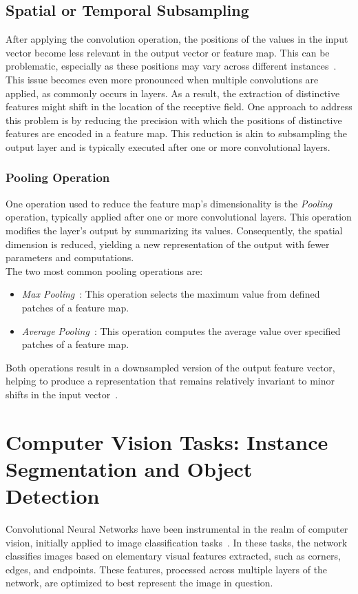 \subsection{Spatial or Temporal Subsampling}
After applying the convolution operation, the positions of the values in the input vector become less relevant in the output vector or feature map. This can be problematic, especially as these positions may vary across different instances~\cite{726791}. This issue becomes even more pronounced when multiple convolutions are applied, as commonly occurs in layers. As a result, the extraction of distinctive features might shift in the location of the receptive field. One approach to address this problem is by reducing the precision with which the positions of distinctive features are encoded in a feature map. This reduction is akin to subsampling the output layer and is typically executed after one or more convolutional layers.

\subsubsection{Pooling Operation}
One operation used to reduce the feature map's dimensionality is the \textit{Pooling} operation, typically applied after one or more convolutional layers. This operation modifies the layer's output by summarizing its values. Consequently, the spatial dimension is reduced, yielding a new representation of the output with fewer parameters and computations.\\

The two most common pooling operations are:
\begin{itemize}
    \item \textit{Max Pooling}~\cite{Zhou1988ComputationOO}: This operation selects the maximum value from defined patches of a feature map.
    \item \textit{Average Pooling}~\cite{726791}: This operation computes the average value over specified patches of a feature map.
\end{itemize}
Both operations result in a downsampled version of the output feature vector, helping to produce a representation that remains relatively invariant to minor shifts in the input vector~\cite{Goodfellow-et-al-2016}.

\section{Computer Vision Tasks: Instance Segmentation and Object Detection}
\label{sect:comp-vision-tasks}
Convolutional Neural Networks have been instrumental in the realm of computer vision, initially applied to image classification tasks~\cite{6795724, 726791}. In these tasks, the network classifies images based on elementary visual features extracted, such as corners, edges, and endpoints. These features, processed across multiple layers of the network, are optimized to best represent the image in question. 

